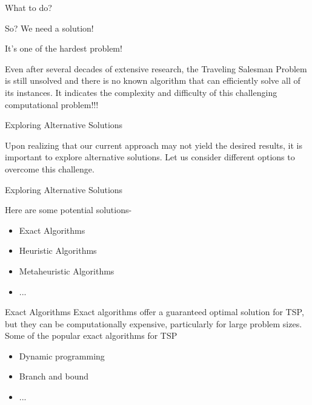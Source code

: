 \documentclass[12pt]{beamer}
\begin{document}
\begin{frame}{What to do?}
\begin{block}{So?}
    We need a solution!
\end{block}
    
\end{frame}

\begin{frame}{It's one of the hardest problem!}
    
  \begin{alertblock}{ }
    Even after several decades of extensive research, the Traveling Salesman Problem is still unsolved and there is no known algorithm that can efficiently solve all of its instances.
    \newline
    \newline
    It indicates the complexity and difficulty of this challenging computational problem!!!
  \end{alertblock}

\end{frame}


\begin{frame}{Exploring Alternative Solutions}
    \begin{block}{ }
     Upon realizing that our current approach may not yield the desired results, it is important to explore alternative solutions. Let us consider different options to overcome this challenge.
    \end{block}
\end{frame}


\begin{frame} {Exploring Alternative Solutions}

Here are some potential solutions-

    \begin{itemize}
        \item <1-> Exact Algorithms
        \item <2-> Heuristic Algorithms
        \item <3-> Metaheuristic Algorithms
        \item <4> ...
    \end{itemize}
  \end{frame}

  \begin{frame}      
  
  \begin{block}{Exact Algorithms}
   Exact algorithms offer a guaranteed optimal solution for TSP, but they can be computationally expensive, particularly for large problem sizes. \\
   Some of the popular exact algorithms for TSP 
    \begin{itemize}
      \item Dynamic programming\pause
      \item Branch and bound \pause
      \item ...
    \end{itemize}
  \end{block}

\end{frame}
\end{document}
